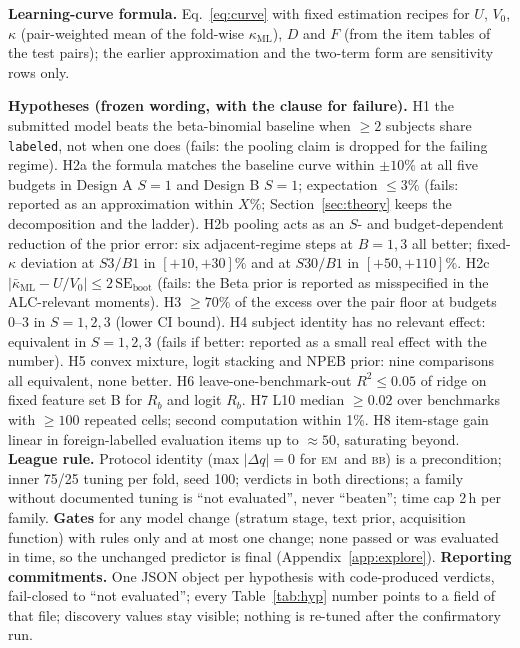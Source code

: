 \documentclass{article}
\newcommand{\BB}{\textsc{bb}}
\newcommand{\EM}{\textsc{em}}
\begin{document}
\textbf{Learning-curve formula.} Eq.~\ref{eq:curve} with fixed estimation recipes for $U$, $V_0$, $\kappa$ (pair-weighted
mean of the fold-wise $\kappa_{\mathrm{ML}}$), $D$ and $F$ (from the item tables of the test pairs); the earlier
approximation and the two-term form are sensitivity rows only.

\textbf{Hypotheses (frozen wording, with the clause for failure).}
H1 the submitted model beats the beta-binomial baseline when $\ge 2$ subjects share \texttt{labeled}, not when one does
(fails: the pooling claim is dropped for the failing regime).
H2a the formula matches the baseline curve within $\pm 10\%$ at all five budgets in Design A $S = 1$ and Design B
$S = 1$; expectation $\le 3\%$ (fails: reported as an approximation within $X\%$; Section~\ref{sec:theory} keeps the
decomposition and the ladder).
H2b pooling acts as an $S$- and budget-dependent reduction of the prior error: six adjacent-regime steps at $B = 1, 3$
all better; fixed-$\kappa$ deviation at $S3/B1$ in $[+10, +30]\%$ and at $S30/B1$ in $[+50, +110]\%$.
H2c $|\bar\kappa_{\mathrm{ML}} - U/V_0| \le 2\,\mathrm{SE}_{\mathrm{boot}}$ (fails: the Beta prior is reported as
misspecified in the ALC-relevant moments).
H3 $\ge 70\%$ of the excess over the pair floor at budgets 0--3 in $S = 1, 2, 3$ (lower CI bound).
H4 subject identity has no relevant effect: equivalent in $S = 1, 2, 3$ (fails if better: reported as a small real
effect with the number).
H5 convex mixture, logit stacking and NPEB prior: nine comparisons all equivalent, none better.
H6 leave-one-benchmark-out $R^2 \le 0.05$ of ridge on fixed feature set B for $R_b$ and logit $R_b$.
H7 L10 median $\ge 0.02$ over benchmarks with $\ge 100$ repeated cells; second computation within 1\%.
H8 item-stage gain linear in foreign-labelled evaluation items up to $\approx 50$, saturating beyond.
\textbf{League rule.} Protocol identity (max $|\Delta q| = 0$ for \EM\ and \BB) is a precondition; inner 75/25 tuning
per fold, seed 100; verdicts in both directions; a family without documented tuning is ``not evaluated'', never
``beaten''; time cap 2\,h per family. \textbf{Gates} for any model change (stratum stage, text prior, acquisition
function) with rules only and at most one change; none passed or was evaluated in time, so the unchanged predictor is
final (Appendix~\ref{app:explore}). \textbf{Reporting commitments.} One JSON object per hypothesis with code-produced
verdicts, fail-closed to ``not evaluated''; every Table~\ref{tab:hyp} number points to a field of that file; discovery
values stay visible; nothing is re-tuned after the confirmatory run.
\end{document}
